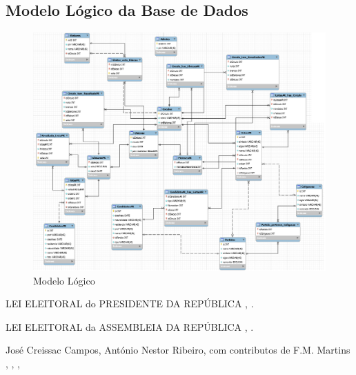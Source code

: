 \documentclass[a4paper,12pt]{report}
\begin{document}
\subsection{Modelo Lógico da Base de Dados} 
\begin{figure}[H]
	\includegraphics[width=1.2\textwidth]{media/modeloLogico/modelo_logico.png}
	 \caption{Modelo Lógico}
\end{figure}

\listoffigures
\begin{thebibliography}{1}
LEI ELEITORAL do PRESIDENTE DA REPÚBLICA
,
.

LEI ELEITORAL da ASSEMBLEIA DA REPÚBLICA
,
.

José Creissac Campos, António Nestor Ribeiro, com contributos de F.M. Martins
,
,
,

\end{thebibliography}
\end{document}
